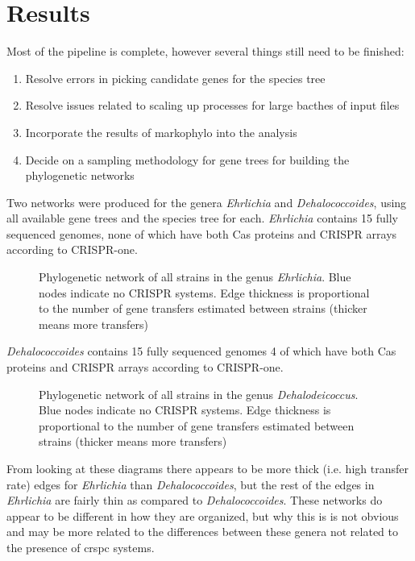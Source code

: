 \section*{\huge Results}
Most of the pipeline is complete, however several things still need to be finished:
\begin{enumerate}
    \item Resolve errors in picking candidate genes for the species tree
    \item Resolve issues related to scaling up processes for large bacthes of input files
    \item Incorporate the results of markophylo into the analysis
    \item Decide on a sampling methodology for gene trees for building the phylogenetic networks
\end{enumerate}
Two networks were produced for the genera \textit{Ehrlichia} and \textit{Dehalococcoides}, using all available gene trees and the species tree for each.
\textit{Ehrlichia} contains 15 fully sequenced genomes, none of which have both Cas proteins and CRISPR arrays according to CRISPR-one.
\begin{figure}[htb!]
    \caption{Phylogenetic network of all strains in the genus \textit{Ehrlichia}. Blue nodes indicate no CRISPR systems. Edge thickness is proportional to the number of gene transfers estimated between strains (thicker means more transfers)}
\end{figure}
\FloatBarrier
\textit{Dehalococcoides} contains 15 fully sequenced genomes 4 of which have both Cas proteins and CRISPR arrays according to CRISPR-one.
\begin{figure}[htb!]
    \caption{Phylogenetic network of all strains in the genus \textit{Dehalodeicoccus}. Blue nodes indicate no CRISPR systems. Edge thickness is proportional to the number of gene transfers estimated between strains (thicker means more transfers)}
\end{figure}
\FloatBarrier
From looking at these diagrams there appears to be more thick (i.e. high transfer rate) edges for \textit{Ehrlichia} than \textit{Dehalococcoides}, but the rest of the edges in \textit{Ehrlichia} are fairly thin as compared to \textit{Dehalococcoides}.
These networks do appear to be different in how they are organized, but why this is is not obvious and may be more related to the differences between these genera not related to the presence of \ac{crspc} systems.

